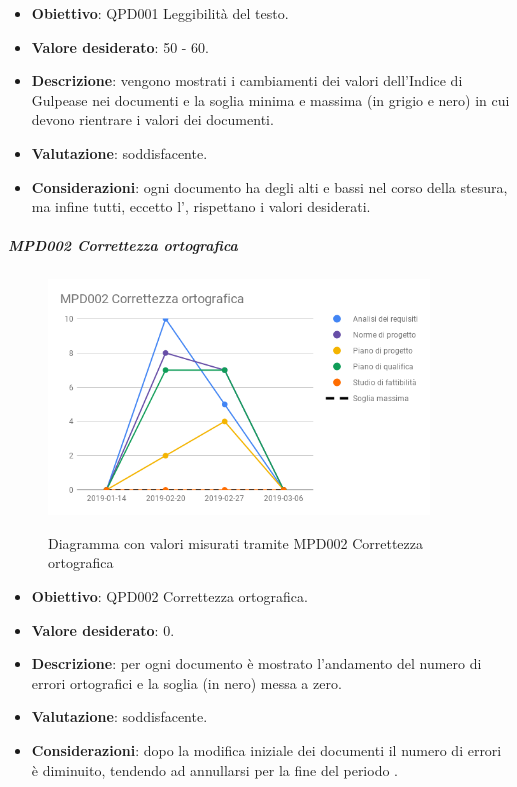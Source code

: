 	\begin{itemize}
		\item \textbf{Obiettivo}: QPD001 Leggibilità del testo.
		\item \textbf{Valore desiderato}: 50 - 60.
		\item \textbf{Descrizione}: vengono mostrati i cambiamenti dei valori dell'Indice di Gulpease nei documenti e la soglia minima e massima (in grigio e nero) in cui devono rientrare i valori dei documenti.
		\item \textbf{Valutazione}: soddisfacente.
		\item \textbf{Considerazioni}: ogni documento ha degli alti e bassi nel corso della stesura, ma infine tutti, eccetto l'\AdR, rispettano i valori desiderati.
	\end{itemize}


	\subparagraph{MPD002 Correttezza ortografica}

	\begin{figure}[H]
		\centering
		\includegraphics[width=0.9\textwidth]{img/cruscotti/RP/MPD002.png}
		\label{immagineCorrettezzaOrtograficaRP}
		\caption{Diagramma con valori misurati tramite MPD002 Correttezza ortografica}
	\end{figure}

	\begin{itemize}
		\item \textbf{Obiettivo}: QPD002 Correttezza ortografica.
		\item \textbf{Valore desiderato}: 0.
		\item \textbf{Descrizione}: per ogni documento è mostrato l'andamento del numero di errori ortografici e la soglia (in nero) messa a zero.
		\item \textbf{Valutazione}: soddisfacente.
		\item \textbf{Considerazioni}: dopo la modifica iniziale dei documenti il numero di errori è diminuito, tendendo ad annullarsi per la fine del periodo \RP.
	\end{itemize}




